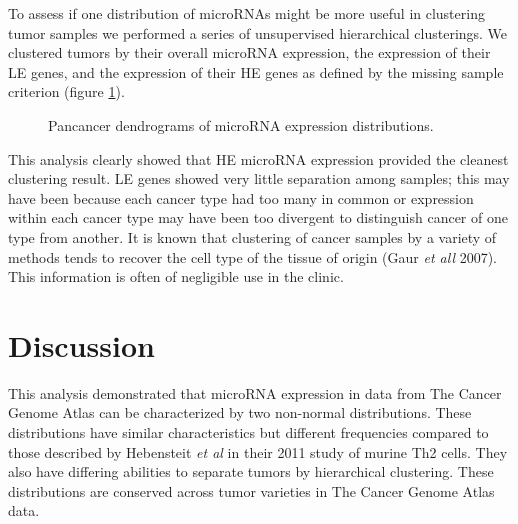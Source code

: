 \documentclass[12pt]{report}
\begin{document}
To assess if one distribution of microRNAs might be more useful in clustering tumor samples we performed a series of unsupervised hierarchical clusterings. We clustered
tumors by their overall microRNA expression, the expression of their LE genes, and the expression of their HE genes as defined by the missing sample criterion (figure \ref{fig::dendros}).

\begin{figure}[H]
  \centering
  \caption{Pancancer dendrograms of microRNA expression distributions.}
 \label{fig::dendros}
\end{figure}

This analysis clearly showed that HE microRNA expression provided the cleanest clustering result. LE genes showed very little separation among samples; this may have been because each
cancer type had too many in common or expression within each cancer type may have been too divergent to distinguish cancer of one type from another. It is known that clustering of cancer
samples by a variety of methods tends to recover the cell type of the tissue of origin (Gaur \textit{et all} 2007). This information is often of negligible use in the clinic.





\section*{Discussion}
  This analysis demonstrated that microRNA expression in data from The Cancer Genome Atlas can be characterized by two non-normal distributions. These distributions have similar characteristics but
  different frequencies compared to those described by Hebensteit \textit{et al} in their 2011 study of murine Th2 cells. They also have differing abilities to separate tumors by hierarchical clustering.
  These distributions are conserved across tumor varieties in The Cancer Genome Atlas data.
  
\end{document}
